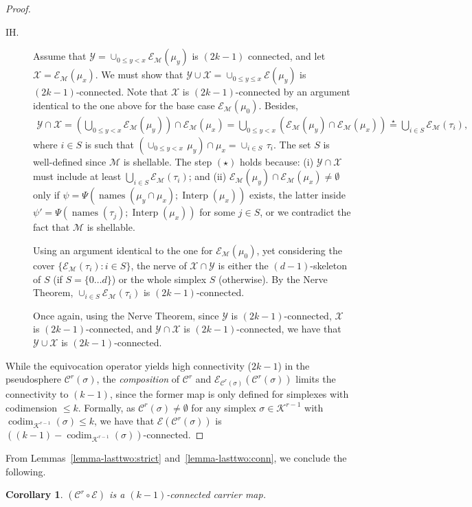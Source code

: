 \documentclass[11pt]{article}
\newcommand{\cC}{\ensuremath{\mathcal{C}}}
\newcommand{\cE}{\ensuremath{\mathcal{E}}}
\newcommand{\cK}{\ensuremath{\mathcal{K}}}
\newcommand{\cM}{\ensuremath{\mathcal{M}}}
\newcommand{\cY}{\ensuremath{\mathcal{Y}}}
\newcommand{\cX}{\ensuremath{\mathcal{X}}}
\DeclareMathOperator{\codim}{codim}
\DeclareMathOperator{\names}{names}\DeclareMathOperator{\name}{name}\DeclareMathOperator{\sgn}{sgn}
\newtheorem{corollary}[theorem]{Corollary}
\newcommand{\set}[1]{\{#1\}}
\DeclareMathOperator{\interp}{Interp}
\begin{document}
\begin{proof}
\begin{description}
	\item[IH.] Assume that $\cY = \cup_{0 \le y < x} \cE_{\cM}(\mu_y)$ is $(2k - 1)$ connected,
and let $\cX = \cE_{\cM}(\mu_x)$.
We must show that $\cY \cup \cX = \cup_{0 \le y \le x} \cE(\mu_y)$ is $(2k - 1)$-connected.
Note that $\cX$ is $(2k - 1)$-connected by an argument identical to the one above for the base case $\cE_{\cM}(\mu_0)$.
Besides,
\begin{align*}
\cY \cap \cX
= \left( \bigcup_{0 \le y < x} \cE_{\cM}(\mu_y) \right) \cap \cE_{\cM}(\mu_x)
= \bigcup_{0 \le y < x} (\cE_{\cM}(\mu_y) \cap \cE_{\cM}(\mu_x))
\stackrel{\star}{=} \bigcup_{i \in S} \cE_{\cM}(\tau_i) \mathrm{,}
\end{align*}
where $i \in S$ is such that $(\cup_{0 \le y < x} \, \mu_y) \cap \mu_x = \cup_{i \in S} \, \tau_i$.
The set $S$ is well-defined since $\cM$ is shellable.
The step $(\star)$ holds because:
(i) $\cY \cap \cX$ must include at least $\bigcup_{i \in S} \cE_{\cM}(\tau_i)$;
and (ii) $\cE_{\cM}(\mu_y) \cap \cE_{\cM}(\mu_x) \ne \emptyset$ only if
$\psi = \Psi(\names(\mu_y \cap \mu_x); \interp(\mu_x))$ exists,
the latter inside $\psi' = \Psi(\names(\tau_j); \interp(\mu_x))$
for some $j \in S$,
or we contradict the fact that $\cM$ is shellable.


Using an argument identical to the one for $\cE_{\cM}(\mu_0)$,
yet considering the cover $\set{\cE_{\cM}(\tau_i): i \in S}$,
the nerve of $\cX \cap \cY$ is either the $(d - 1)$-skeleton of $S$ (if $S = \set{0 \ldots d}$) or the whole simplex $S$ (otherwise).
By the Nerve Theorem,
$\cup_{i \in S} \cE_{\cM}(\tau_i)$ is $(2k - 1)$-connected.

Once again,
using the Nerve Theorem,
since $\cY$ is $(2k - 1)$-connected,
$\cX$ is $(2k - 1)$-connected,
and $\cY \cap \cX$ is $(2k - 1)$-connected,
we have that $\cY \cup \cX$ is $(2k - 1)$-connected.
\end{description}
While the equivocation operator yields high connectivity ($2k - 1$)
in the pseudosphere $\cC^r(\sigma)$,
the \emph{composition} of $\cC^r$ and $\cE_{\cC^r(\sigma)}(\cC^r(\sigma))$
limits the connectivity to $(k - 1)$,
since the former map is only defined for simplexes with codimension $\le k$.
Formally,
as $\cC^r(\sigma) \ne \emptyset$ for any simplex $\sigma \in \cK^{r-1}$ with $\codim_{\cK^{r-1}}(\sigma) \le k$,
we have that $\cE(\cC^r(\sigma))$ is $((k - 1) - \codim_{\cK^{r-1}}(\sigma))$-connected.
\end{proof}

From Lemmas~\ref{lemma-lasttwo:strict} and~\ref{lemma-lasttwo:conn},
we conclude the following.
\begin{corollary}
\label{corollary-lasttwo:conn}
$(\cC^r \circ \cE)$ is a $(k - 1)$-connected carrier map.
\end{corollary}
\end{document}
